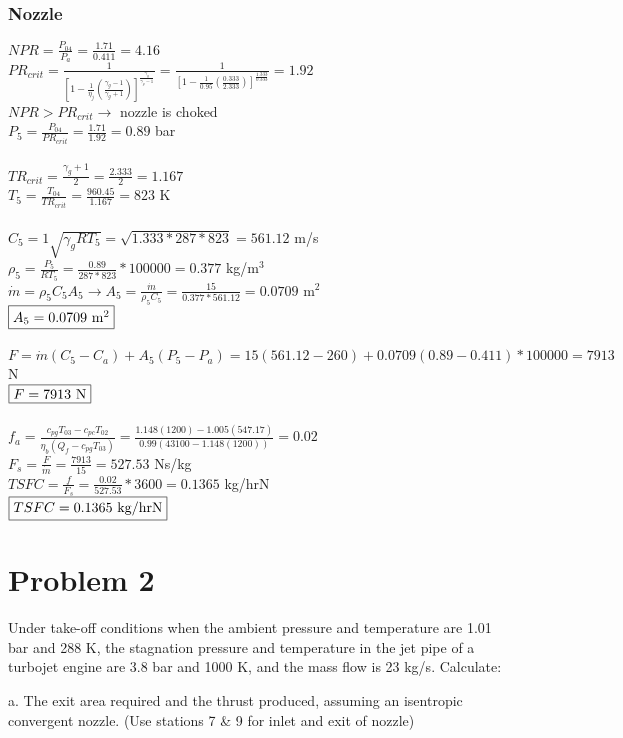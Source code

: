 \documentclass{article}
\begin{document}
\subsubsection*{Nozzle}
$NPR=\frac{P_{04}}{P_a}=\frac{1.71}{0.411}=4.16$ \\
$PR_{crit}=\frac{1}{[1-\frac{1}{\eta_j}(\frac{\gamma_g-1}{\gamma_g+1})]
^\frac{\gamma_g}{\gamma_g-1}}=\frac{1}{[1-\frac{1}{0.95}(\frac{0.333}{2.333})]
^\frac{1.333}{0.333}}=1.92$ \\
$NPR>PR_{crit} \rightarrow$ nozzle is choked \\
$P_5=\frac{P_{04}}{PR_{crit}}=\frac{1.71}{1.92}=0.89$ bar \\\\
$TR_{crit}=\frac{\gamma_g+1}{2}=\frac{2.333}{2}=1.167$ \\
$T_5=\frac{T_{04}}{TR_{crit}}=\frac{960.45}{1.167}=823$ K \\\\
$C_5=1\sqrt{\gamma_gRT_5}=\sqrt{1.333*287*823}=561.12$ m/s \\
$\rho_5=\frac{P_5}{RT_5}=\frac{0.89}{287*823}*100000=0.377$ kg/m$^3$ \\
$\dot{m}=\rho_5C_5A_5 \rightarrow A_5=\frac{\dot{m}}{\rho_5C_5}=\frac{15}{0.377*561.12}
=0.0709$ m$^2$ \\
$\fbox{$A_5=0.0709$ m$^2$}$ \\\\
$F=\dot{m}(C_5-C_a)+A_5(P_5-P_a)=15(561.12-260)+0.0709(0.89-0.411)*100000=7913$ N \\
$\fbox{$F=7913$ N}$ \\\\
$f_a=\frac{c_{pg}T_{03}-c_{pc}T_{02}}{\eta_b(Q_f-c_{pg}T_{03})}=
\frac{1.148(1200)-1.005(547.17)}{0.99(43100-1.148(1200))}=0.02$ \\
$F_s=\frac{F}{\dot{m}}=\frac{7913}{15}=527.53$ Ns/kg \\
$TSFC=\frac{f}{F_s}=\frac{0.02}{527.53}*3600=0.1365$ kg/hrN \\
$\fbox{$TSFC=0.1365$ kg/hrN}$

\section*{Problem 2}
Under take-off conditions when the ambient pressure and temperature are 1.01
bar and 288 K, the stagnation pressure and temperature in the jet pipe of a turbojet
engine are 3.8 bar and 1000 K, and the mass flow is 23 kg/s. Calculate:

a. The exit area required and the thrust produced, assuming an isentropic
convergent nozzle. (Use stations 7 \& 9 for inlet and exit of nozzle)
\end{document}
